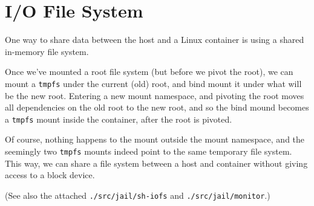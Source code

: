 
\section{I/O File System}

One way to share data between the host and a Linux container is using a shared
in-memory file system.

Once we've mounted a root file system (but before we pivot the root), we can
mount a \texttt{tmpfs} under the current (old) root, and bind mount it under
what will be the new root. Entering a new mount namespace, and pivoting the
root moves all dependencies on the old root to the new root, and so the bind
mound becomes a \texttt{tmpfs} mount inside the container, after the root is
pivoted.

Of course, nothing happens to the mount outside the mount namespace, and the
seemingly two \texttt{tmpfs} mounts indeed point to the same temporary file
system. This way, we can share a file system between a host and container
without giving access to a block device.

(See also the attached \texttt{./src/jail/sh-iofs} and
\texttt{./src/jail/monitor}.)
